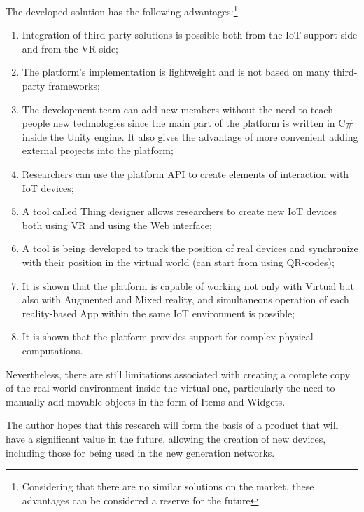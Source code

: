 The developed solution has the following advantages:\footnote{Considering that there are no similar solutions on the market, these advantages can be considered a reserve for the future}
\begin{enumerate}
    \item Integration of third-party solutions is possible both from the IoT support side and from the VR side;
    \item The platform's implementation is lightweight and is not based on many third-party frameworks;
    \item The development team can add new members without the need to teach people new technologies since the main part of the platform is written in C\# inside the Unity engine. It also gives the advantage of more convenient adding external projects into the platform;
    \item Researchers can use the platform API to create elements of interaction with IoT devices;
    \item A tool called Thing designer allows researchers to create new IoT devices both using VR and using the Web interface;
    \item A tool is being developed to track the position of real devices and synchronize with their position in the virtual world (can start from using QR-codes);
    \item It is shown that the platform is capable of working not only with Virtual but also with Augmented and Mixed reality, and simultaneous operation of each reality-based App within the same IoT environment is possible;
    \item It is shown that the platform provides support for complex physical computations.
\end{enumerate}

Nevertheless, there are still limitations associated with creating a complete copy of the real-world environment inside the virtual one, particularly the need to manually add movable objects in the form of Items and Widgets.

The author hopes that this research will form the basis of a product that will have a significant value in the future, allowing the creation of new devices, including those for being used in the new generation networks.